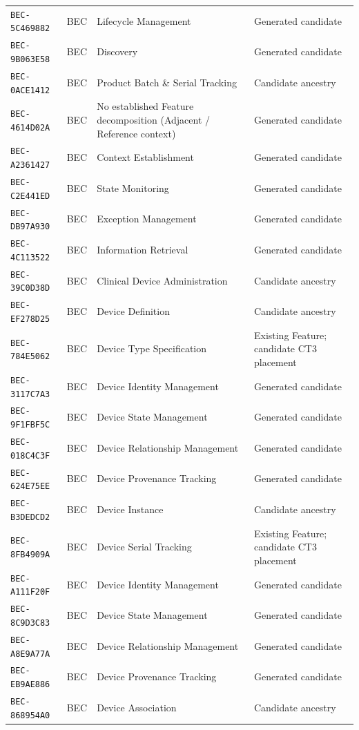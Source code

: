 \documentclass[11pt,a4paper,openany]{book}
\begin{document}
\begin{longtable}{@{}p{.19\linewidth}p{.12\linewidth}p{.39\linewidth}p{.24\linewidth}@{}}
\texttt{BEC-5C469882} & BEC & Lifecycle Management & Generated candidate \\
\texttt{BEC-9B063E58} & BEC & Discovery & Generated candidate \\
\texttt{BEC-0ACE1412} & BEC & Product Batch \& Serial Tracking & Candidate ancestry \\
\texttt{BEC-4614D02A} & BEC & No established Feature decomposition (Adjacent / Reference context) & Generated candidate \\
\texttt{BEC-A2361427} & BEC & Context Establishment & Generated candidate \\
\texttt{BEC-C2E441ED} & BEC & State Monitoring & Generated candidate \\
\texttt{BEC-DB97A930} & BEC & Exception Management & Generated candidate \\
\texttt{BEC-4C113522} & BEC & Information Retrieval & Generated candidate \\
\texttt{BEC-39C0D38D} & BEC & Clinical Device Administration & Candidate ancestry \\
\texttt{BEC-EF278D25} & BEC & Device Definition & Candidate ancestry \\
\texttt{BEC-784E5062} & BEC & Device Type Specification & Existing Feature; candidate CT3 placement \\
\texttt{BEC-3117C7A3} & BEC & Device Identity Management & Generated candidate \\
\texttt{BEC-9F1FBF5C} & BEC & Device State Management & Generated candidate \\
\texttt{BEC-018C4C3F} & BEC & Device Relationship Management & Generated candidate \\
\texttt{BEC-624E75EE} & BEC & Device Provenance Tracking & Generated candidate \\
\texttt{BEC-B3DEDCD2} & BEC & Device Instance & Candidate ancestry \\
\texttt{BEC-8FB4909A} & BEC & Device Serial Tracking & Existing Feature; candidate CT3 placement \\
\texttt{BEC-A111F20F} & BEC & Device Identity Management & Generated candidate \\
\texttt{BEC-8C9D3C83} & BEC & Device State Management & Generated candidate \\
\texttt{BEC-A8E9A77A} & BEC & Device Relationship Management & Generated candidate \\
\texttt{BEC-EB9AE886} & BEC & Device Provenance Tracking & Generated candidate \\
\texttt{BEC-868954A0} & BEC & Device Association & Candidate ancestry \\

\end{longtable}
\end{document}
